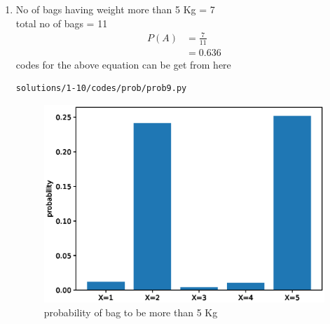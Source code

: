 \begin{enumerate}
\item No of bags having weight more than 5 Kg = 7
\\
total no of bags = 11
\begin{align}
P\left(A\right) &= \frac{7}{11}
\\
&=0.636
\end{align}
codes for the above equation can be get from here
\begin{lstlisting}
solutions/1-10/codes/prob/prob9.py
\end{lstlisting}
\begin{figure}[!ht]
	\centering
	\includegraphics[width=\columnwidth]{./solutions/1-10/figures/prob/prob8.eps}
	\caption{probability of bag to be more than 5 Kg  }
	\label{fig:bt9}
\end{figure}
\end{enumerate}
